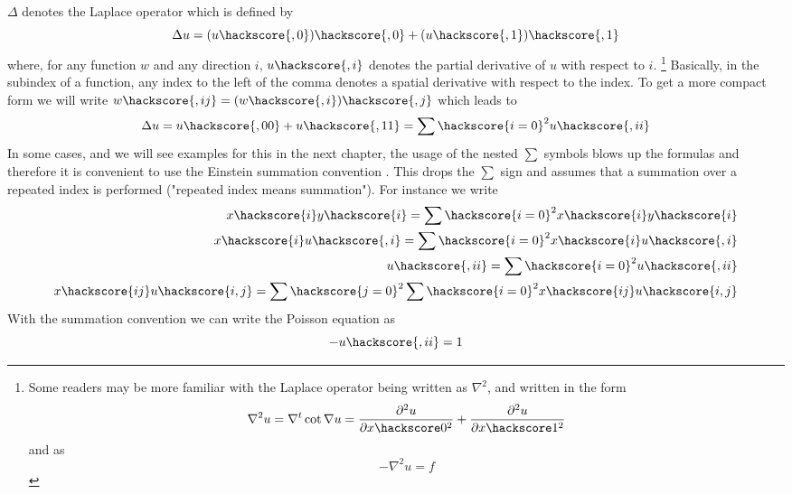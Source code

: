 $\Delta$ denotes the Laplace operator which is defined by
\begin{equation}
\Delta u = (u\hackscore {,0})\hackscore{,0}+(u\hackscore{,1})\hackscore{,1}
\label{eq:FirstSteps.1.1}
\end{equation}
where, for any function $w$ and any direction $i$, $u\hackscore{,i}$
denotes the partial derivative  of $u$ with respect to $i$.  
\footnote{Some readers
may be more familiar with the Laplace operator being written
as $\nabla^2$, and written in the form
\begin{equation*}
\nabla^2 u = \nabla^t \cot \nabla u =  \frac{\partial^2 u}{\partial x\hackscore 0^2} 
+ \frac{\partial^2 u}{\partial  x\hackscore 1^2}
\end{equation*}
and  as
\begin{equation*}
-\nabla^2 u = f
\end{equation*}
}
Basically, in the subindex of a function, any index to the left of the comma denotes a spatial derivative with respect 
to the index. To get a more compact form we will write $w\hackscore{,ij}=(w\hackscore {,i})\hackscore{,j}$
which leads to
\begin{equation}
\Delta u = u\hackscore{,00}+u\hackscore{,11}=\sum\hackscore{i=0}^2 u\hackscore{,ii}
\label{eq:FirstSteps.1.1b}
\end{equation}
In some cases, and we will see examples for this in the next chapter,
the usage of the nested $\sum$ symbols blows up the formulas and therefore
it is convenient to use the Einstein summation convention . This 
drops the $\sum$ sign and assumes that a summation over a repeated index is performed 
("repeated index means summation"). For instance we write
\begin{eqnarray}
x\hackscore{i}y\hackscore{i}=\sum\hackscore{i=0}^2 x\hackscore{i}y\hackscore{i}   \\
x\hackscore{i}u\hackscore{,i}=\sum\hackscore{i=0}^2 x\hackscore{i}u\hackscore{,i}   \\
u\hackscore{,ii}=\sum\hackscore{i=0}^2 u\hackscore{,ii} \\
x\hackscore{ij}u\hackscore{i,j}=\sum\hackscore{j=0}^2\sum\hackscore{i=0}^2 x\hackscore{ij}u\hackscore{i,j}   \\
\label{eq:FirstSteps.1.1c}
\end{eqnarray}
With the summation convention we can write the Poisson equation  as
\begin{equation}
- u\hackscore{,ii} =1 
\label{eq:FirstSteps.1.sum}
\end{equation}
